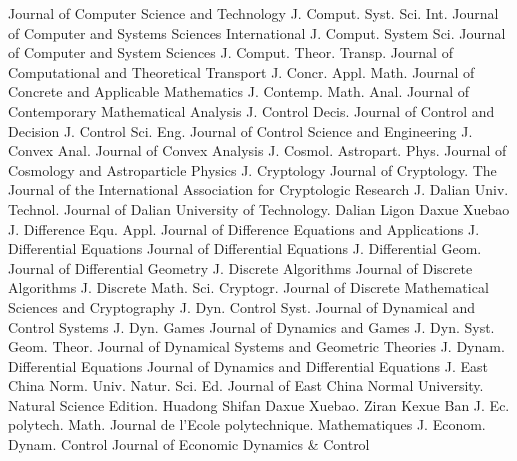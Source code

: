 {Journal of Computer Science and Technology}
{J. Comput. Syst. Sci. Int.}
{Journal of Computer and Systems Sciences International}
{J. Comput. System Sci.}
{Journal of Computer and System Sciences}
{J. Comput. Theor. Transp.}
{Journal of Computational and Theoretical Transport}
{J. Concr. Appl. Math.}
{Journal of Concrete and Applicable Mathematics}
{J. Contemp. Math. Anal.}
{Journal of Contemporary Mathematical Analysis}
{J. Control Decis.}
{Journal of Control and Decision}
{J. Control Sci. Eng.}
{Journal of Control Science and Engineering}
{J. Convex Anal.}
{Journal of Convex Analysis}
{J. Cosmol. Astropart. Phys.}
{Journal of Cosmology and Astroparticle Physics}
{J. Cryptology}
{Journal of Cryptology. The Journal of the International Association for Cryptologic Research}
{J. Dalian Univ. Technol.}
{Journal of Dalian University of Technology. Dalian Ligon Daxue Xuebao}
{J. Difference Equ. Appl.}
{Journal of Difference Equations and Applications}
{J. Differential Equations}
{Journal of Differential Equations}
{J. Differential Geom.}
{Journal of Differential Geometry}
{J. Discrete Algorithms}
{Journal of Discrete Algorithms}
{J. Discrete Math. Sci. Cryptogr.}
{Journal of Discrete Mathematical Sciences and Cryptography}
{J. Dyn. Control Syst.}
{Journal of Dynamical and Control Systems}
{J. Dyn. Games}
{Journal of Dynamics and Games}
{J. Dyn. Syst. Geom. Theor.}
{Journal of Dynamical Systems and Geometric Theories}
{J. Dynam. Differential Equations}
{Journal of Dynamics and Differential Equations}
{J. East China Norm. Univ. Natur. Sci. Ed.}
{Journal of East China Normal University. Natural Science Edition. Huadong Shifan Daxue Xuebao. Ziran Kexue Ban}
{J. Ec. polytech. Math.}
{Journal de l'Ecole polytechnique. Mathematiques}
{J. Econom. Dynam. Control}
{Journal of Economic Dynamics & Control}
